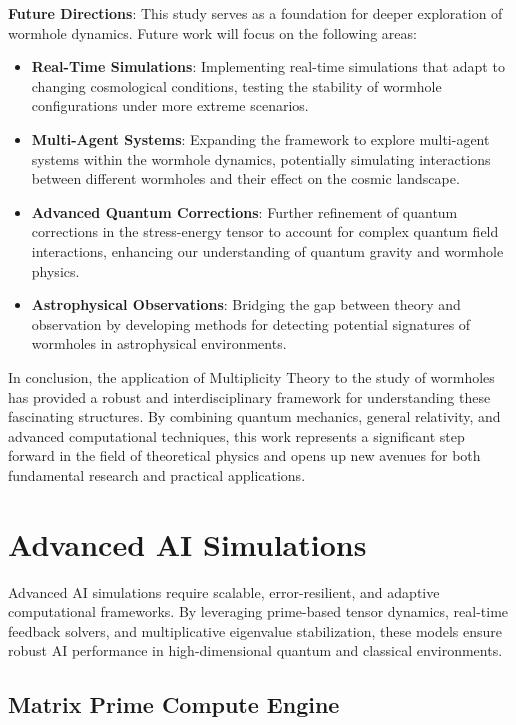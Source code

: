 \documentclass{article}
\theoremstyle{plain}
\begin{document}
\begin{itemize}
\begin{itemize}
\textbf{Future Directions}: This study serves as a foundation for deeper exploration of wormhole dynamics. Future work will focus on the following areas:
\begin{itemize}
    \item \textbf{Real-Time Simulations}: Implementing real-time simulations that adapt to changing cosmological conditions, testing the stability of wormhole configurations under more extreme scenarios.
    \item \textbf{Multi-Agent Systems}: Expanding the framework to explore multi-agent systems within the wormhole dynamics, potentially simulating interactions between different wormholes and their effect on the cosmic landscape.
    \item \textbf{Advanced Quantum Corrections}: Further refinement of quantum corrections in the stress-energy tensor to account for complex quantum field interactions, enhancing our understanding of quantum gravity and wormhole physics.
    \item \textbf{Astrophysical Observations}: Bridging the gap between theory and observation by developing methods for detecting potential signatures of wormholes in astrophysical environments.
\end{itemize}

In conclusion, the application of Multiplicity Theory to the study of wormholes has provided a robust and interdisciplinary framework for understanding these fascinating structures. By combining quantum mechanics, general relativity, and advanced computational techniques, this work represents a significant step forward in the field of theoretical physics and opens up new avenues for both fundamental research and practical applications.

\section{Advanced AI Simulations}

Advanced AI simulations require scalable, error-resilient, and adaptive computational frameworks. By leveraging prime-based tensor dynamics, real-time feedback solvers, and multiplicative eigenvalue stabilization, these models ensure robust AI performance in high-dimensional quantum and classical environments.

\subsection{Matrix Prime Compute Engine}


\end{itemize}
\end{itemize}
\end{document}
